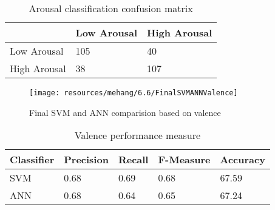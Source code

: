 \begin{table}[h!]
        \caption{Arousal classification confusion matrix}
        \begin{center}
                \begin{tabular}{|l|l|l|}
                        \hline
                        &
                        Low Arousal
                        &
                        High Arousal
                        \\\hline

                        Low Arousal
                        &
                        105
                        &
                        40
                        \\\hline

                        High Arousal
                        &
                        38
                        &
                        107
                        \\\hline
                \end{tabular}
        \end{center}
\end{table}

\begin{figure}[h!]
        \centering
        \texttt{[image: resources/mehang/6.6/FinalSVMANNValence]}
        \caption{Final SVM and ANN comparision based on valence}

\end{figure}

\begin{table}[h!]
        \caption{Valence performance measure}
        \begin{center}
                \begin{tabular}{|l|l|l|l|l|}
                        \hline

                        Classifier
                        &
                        Precision 
                        &
                        Recall 
                        &
                        F-Measure
                        &
                        Accuracy
                        \\\hline

                        SVM
                        &
                        0.68
                        &
                        0.69
                        &
                        0.68
                        &
                        67.59
                        \\\hline

                        ANN
                        &
                        0.68
                        &
                        0.64
                        &
                        0.65
                        &
                        67.24
                        \\\hline

                \end{tabular}
        \end{center}
\end{table}

